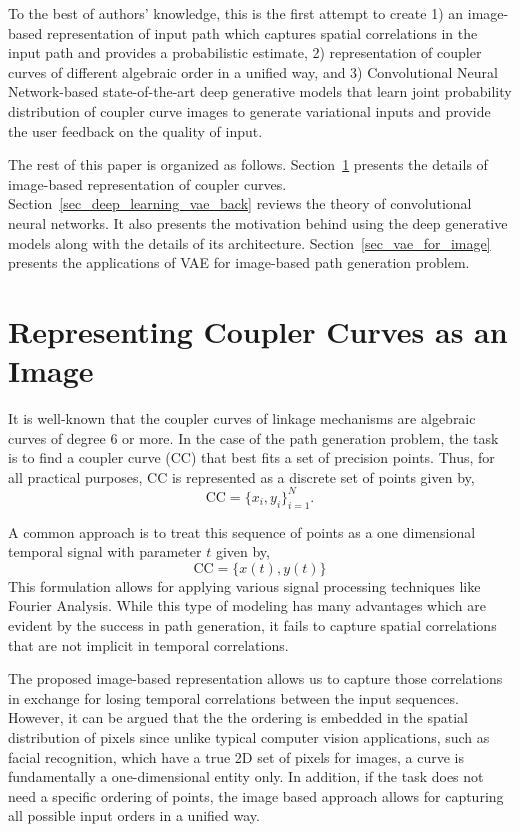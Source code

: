 To the best of authors' knowledge, this is the first attempt to create 1) an image-based representation of input path which captures spatial correlations in the input path and provides a probabilistic estimate, 2) representation of coupler curves of different algebraic order in a unified way, and 3) Convolutional Neural Network-based state-of-the-art deep generative models that learn joint probability distribution of coupler curve images to generate variational inputs and provide the user feedback on the quality of input. 


The rest of this paper is organized as follows. Section~\ref{sec_image_representation} presents the details of image-based representation of coupler curves. Section~\ref{sec_deep_learning_vae_back} reviews the theory of convolutional neural networks. It also presents the motivation behind using the deep generative models along with the details of its architecture. Section~\ref{sec_vae_for_image} presents the applications of VAE for image-based path generation problem.


\section{Representing Coupler Curves as an Image}\label{sec_image_representation}
It is well-known that the coupler curves of linkage mechanisms are algebraic curves of degree 6 or more. In the case of the path generation problem, the task is to find a coupler curve (CC) that best fits a set of precision points. Thus, for all practical purposes, CC is represented as a discrete set of points given by,
\begin{equation*}
    \textrm{CC} = \{ x_i, y_i \}_{i=1}^N.
\end{equation*}

A common approach is to treat this sequence of points as a one dimensional temporal signal with parameter $t$ given by,  
\begin{equation*}
    \textrm{CC} = \{x(t), y(t)\}
\end{equation*}
This formulation allows for applying various signal processing techniques like Fourier Analysis. While this type of modeling has many advantages which are evident by the success in path generation, it fails to capture spatial correlations that are not implicit in temporal correlations.

The proposed image-based representation allows us to capture those correlations in exchange for losing temporal correlations between the input sequences.
However, it can be argued that the the ordering is embedded in the spatial distribution of pixels since unlike typical computer vision applications, such as facial recognition, which have a true 2D set of pixels for images, a curve is fundamentally a one-dimensional entity only. In addition, if the task does not need a specific ordering of points, the image based approach allows for capturing all possible input orders in a unified way.

